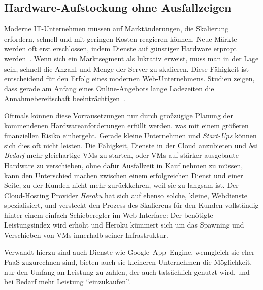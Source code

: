 \subsection{Hardware-Aufstockung ohne Ausfallzeigen}
Moderne IT-Unternehmen müssen auf Marktänderungen, die Skalierung
erfordern, schnell und mit geringen Kosten reagieren können. Neue
Märkte werden oft erst erschlossen, indem Dienste auf günstiger
Hardware erpropt werden~\cite{tanenbaum1992modern}. Wenn sich ein
Marktsegment als lukrativ erweist, muss man in der Lage sein, schnell
die Anzahl und Menge der Server zu skalieren. Diese Fähigkeit ist
entscheidend für den Erfolg eines modernen Web-Unternehmens. Studien
zeigen, dass gerade am Anfang eines Online-Angebots lange Ladezeiten
die Annahmebereitschaft beeinträchtigen~\cite{kohavi2007online}.

Oftmals können diese Vorrausetzungen nur durch großzügige Planung der
kommendenen Hardwareanforderungen erfüllt werden, was mit einem
größeren finanziellen Risiko einhergeht. Gerade kleine Unternehmen und
\emph{Start-Ups} können sich dies oft nicht leisten. Die Fähigkeit,
Dienste in der Cloud anzubieten und \emph{bei Bedarf} mehr
gleichartige \acp{VM} zu starten, oder \acp{VM} auf stärker ausgebaute
Hardware zu verschieben, ohne dafür Ausfallzeit in Kauf nehmen zu
müssen, kann den Unterschied machen zwischen einem erfolgreichen
Dienst und einer Seite, zu der Kunden nicht mehr zurückkehren, weil
sie zu langsam ist. Der Cloud-Hosting Provider \emph{Heroku} hat sich
auf ebenso solche, kleine, Webdienste spezialisiert, und versteckt den
Prozess des Skalierens für den Kunden vollständig hinter einem einfach
Schieberegler im Web-Interface: Der benötigte Leistungsindex wird
erhöht und Heroku kümmert sich um das Spawning und Verschieben von VMs
innerhalb seiner Infrastruktur.

Verwandt hierzu sind auch Dienste wie Google~App~Engine, wenngleich
sie eher \ac{PaaS} zuzurechnen sind, bieten auch sie kleineren
Unternehmen die Möglichkeit, nur den Umfang an Leistung zu zahlen, der
auch tatsächlich genutzt wird, und bei Bedarf mehr Leistung
"`einzukaufen"'.

